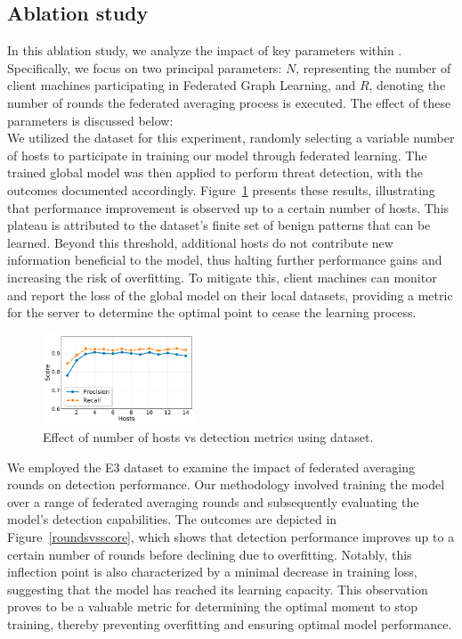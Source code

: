  \subsection{Ablation study}

 In this ablation study, we analyze the impact of key parameters within \Sys. Specifically, we focus on two principal parameters: $N$, representing the number of client machines participating in Federated Graph Learning, and $R$, denoting the number of rounds the federated averaging process is executed. The effect of these parameters is discussed below: \\

 We utilized the \optc dataset for this experiment, randomly selecting a variable number of hosts to participate in training our model through federated learning. The trained global model was then applied to perform threat detection, with the outcomes documented accordingly. Figure~\ref{scoresvshosts} presents these results, illustrating that performance improvement is observed up to a certain number of hosts. This plateau is attributed to the \optc dataset's finite set of benign patterns that can be learned. Beyond this threshold, additional hosts do not contribute new information beneficial to the model, thus halting further performance gains and increasing the risk of overfitting. To mitigate this, client machines can monitor and report the loss of the global model on their local datasets, providing a metric for the server to determine the optimal point to cease the learning process.

\begin{figure}[!t]
  \centering
  \includegraphics[width=0.4\textwidth]{fig/scoresvshosts.pdf}
  \caption{Effect of number of hosts vs detection metrics using \optc dataset.}
  \label{scoresvshosts}
  \vspace{-2ex}
\end{figure}

 We employed the \darpa E3 dataset to examine the impact of federated averaging rounds on detection performance. Our methodology involved training the model over a range of federated averaging rounds and subsequently evaluating the model's detection capabilities. The outcomes are depicted in Figure~\ref{roundsvsscore}, which shows that detection performance improves up to a certain number of rounds before declining due to overfitting. Notably, this inflection point is also characterized by a minimal decrease in training loss, suggesting that the model has reached its learning capacity. This observation proves to be a valuable metric for determining the optimal moment to stop training, thereby preventing overfitting and ensuring optimal model performance.

